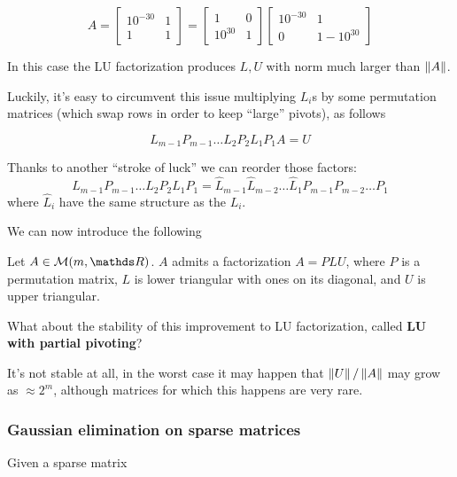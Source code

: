 \documentclass[computational_mathematics.tex]{subfiles}
\begin{document}
\begin{example}
\[
A = \begin{bmatrix}
    10^{-30} & 1\\
    1 & 1
\end{bmatrix} = \begin{bmatrix}
    1 & 0\\
    10^{30} & 1 
\end{bmatrix}
\begin{bmatrix}
    10^{-30} & 1\\
    0 & 1-10^{30}
\end{bmatrix}
\]

In this case the LU factorization produces $L,U$ with norm much larger than $\left\lVert A\right\rVert$.
\end{example}

Luckily, it's easy to circumvent this issue multiplying $L_i$s by some permutation matrices (which swap rows in order to keep ``large'' pivots), as follows

\[
L_{m-1}P_{m-1}\dots L_2P_2L_1P_1A = U
\]

\begin{obs}
Thanks to another ``stroke of luck'' we can reorder those factors: 
\[
L_{m-1}P_{m-1}\dots L_2P_2L_1P_1 = \widehat{L}_{m-1}\widehat{L}_{m-2}\dots \widehat{L}_1 P_{m-1}P_{m-2}\dots P_1
\]
where $\widehat{L}_i$ have the same structure as the $L_i$.
\end{obs}

We can now introduce the following

\begin{theorem}
  Let $A \in \mathcal{M}(m, \R)$. $A$ admits a factorization $A=PLU$, where $P$ is a permutation matrix, $L$ is lower triangular with ones on its diagonal, and $U$ is upper triangular.
\end{theorem}

What about the stability of this improvement to LU factorization, called \textbf{LU with partial pivoting}?

It's not stable at all, in the worst case it may happen that $\left\lVert U\right\rVert / \left\lVert A\right\rVert$ may grow as $\approx 2^m$, although matrices for which this happens are very rare.

\subsubsection{Gaussian elimination on sparse matrices}

Given a sparse matrix 
\end{document}

